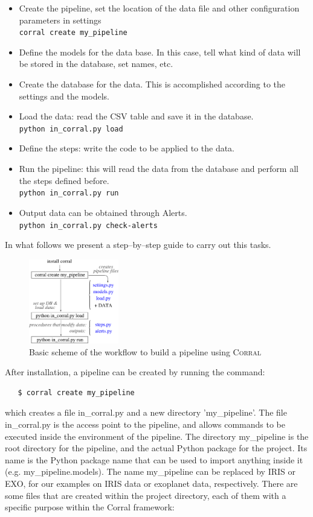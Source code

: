 \documentclass[final,5p,times,twocolumn,authoryear]{elsarticle}
\begin{document}
\begin{itemize}
   \item Create the pipeline, set the location of the data file and
      other configuration parameters in settings\\
      \verb|corral create my_pipeline|
   \item Define the models for the data base.  In this case, tell what
      kind of data will be stored in the database, set names, etc.
   \item Create the database for the data.  This is accomplished
      according to the settings and the models.
   \item Load the data: read the CSV table and save it in the
      database.\\
      \verb|python in_corral.py load|
   \item Define the steps: write the code to be applied to the data.
   \item Run the pipeline: this will read the data from the database
      and perform all the steps defined before.\\
      \verb|python in_corral.py run|
   \item Output data can be obtained through Alerts.\\
      \verb|python in_corral.py check-alerts|
\end{itemize}

In what follows we present a step--by--step guide to carry out this
tasks.


\begin{figure}
\includegraphics[width=0.35\textwidth]{scheme.pdf}
\caption{Basic scheme of the workflow to build a pipeline using \textsc{Corral}}
\label{fig:scheme}
\end{figure}


After installation, a pipeline can be created by running the command:
%
\begin{verbatim}
   $ corral create my_pipeline
\end{verbatim}
%
which creates a file in\_corral.py and a new directory 'my\_pipeline'.
%
The file in\_corral.py is the access point to the pipeline, and allows
commands to be executed inside the environment of the pipeline.
%
The directory my\_pipeline is the root directory for the pipeline, and
the actual Python package for the project.
%
Its name is the Python package name that can be used to import
anything inside it (e.g. my\_pipeline.models).
%
The name my\_pipeline can be replaced by IRIS or EXO, for our examples
on IRIS data or exoplanet data, respectively.
%
There are some files that are created within the project directory,
each of them with a specific purpose within the Corral framework:
\end{document}
